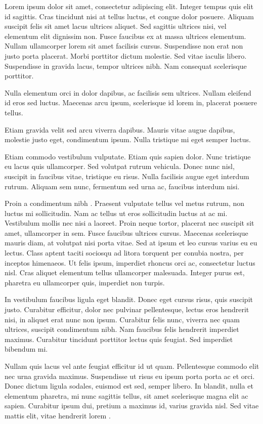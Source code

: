Lorem ipsum dolor sit amet, consectetur adipiscing elit. Integer tempus quis elit id sagittis. Cras tincidunt nisi at tellus luctus, et congue dolor posuere. Aliquam suscipit felis sit amet lacus ultrices aliquet. Sed sagittis ultrices nisi, vel elementum elit dignissim non. Fusce faucibus ex at massa ultrices elementum. Nullam ullamcorper lorem sit amet facilisis cursus. Suspendisse non erat non justo porta placerat. Morbi porttitor dictum molestie. Sed vitae iaculis libero. Suspendisse in gravida lacus, tempor ultrices nibh. Nam consequat scelerisque porttitor.

Nulla elementum orci in dolor dapibus, ac facilisis sem ultrices. Nullam eleifend id eros sed luctus. Maecenas arcu ipsum, scelerisque id lorem in, placerat posuere tellus. 

Etiam gravida velit sed arcu viverra dapibus. Mauris vitae augue dapibus, molestie justo eget, condimentum ipsum. Nulla tristique mi eget semper luctus. 

Etiam commodo vestibulum vulputate. Etiam quis sapien dolor. Nunc tristique eu lacus quis ullamcorper. Sed volutpat rutrum vehicula. Donec nunc nisl, suscipit in faucibus vitae, tristique eu risus. Nulla facilisis augue eget interdum rutrum. Aliquam sem nunc, fermentum sed urna ac, faucibus interdum nisi.

Proin a condimentum nibh \cite{esp32_devkit_reference_design}. Praesent vulputate tellus vel metus rutrum, non luctus mi sollicitudin. Nam ac tellus ut eros sollicitudin luctus at ac mi. Vestibulum mollis nec nisi a laoreet. Proin neque tortor, placerat nec suscipit sit amet, ullamcorper in sem. Fusce faucibus ultrices cursus. Maecenas scelerisque mauris diam, at volutpat nisi porta vitae. Sed at ipsum et leo cursus varius eu eu lectus. Class aptent taciti sociosqu ad litora torquent per conubia nostra, per inceptos himenaeos. Ut felis ipsum, imperdiet rhoncus orci ac, consectetur luctus nisl. Cras aliquet elementum tellus ullamcorper malesuada. Integer purus est, pharetra eu ullamcorper quis, imperdiet non turpis.

In vestibulum faucibus ligula eget blandit. Donec eget cursus risus, quis suscipit justo. Curabitur efficitur, dolor nec pulvinar pellentesque, lectus eros hendrerit nisi, in aliquet erat nunc non ipsum. Curabitur felis nunc, viverra nec quam ultrices, suscipit condimentum nibh. Nam faucibus felis hendrerit imperdiet maximus. Curabitur tincidunt porttitor lectus quis feugiat. Sed imperdiet bibendum mi.

Nullam quis lacus vel ante feugiat efficitur id ut quam. Pellentesque commodo elit nec urna gravida maximus. Suspendisse ut risus eu ipsum porta porta ac et orci. Donec dictum ligula sodales, euismod est sed, semper libero. In blandit, nulla et elementum pharetra, mi nunc sagittis tellus, sit amet scelerisque magna elit ac sapien. Curabitur ipsum dui, pretium a maximus id, varius gravida nisl. Sed vitae mattis elit, vitae hendrerit lorem \cite{github_LVGL, github_celestial}. 


